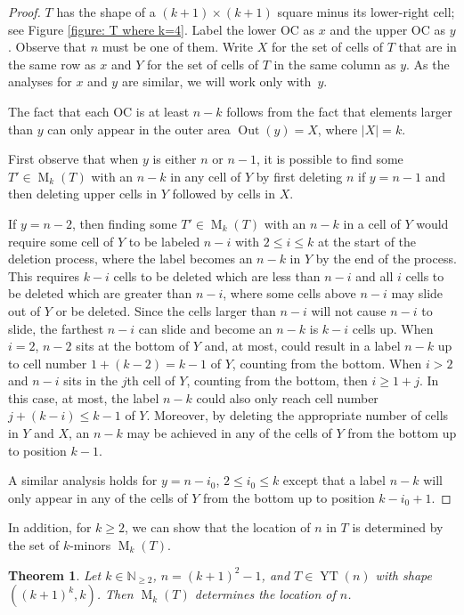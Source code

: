 \documentclass[12pt]{amsart}
\newtheorem{theorem}{Theorem}[section]
\theoremstyle{definition}
\theoremstyle{remark}
\numberwithin{equation}{section}
\numberwithin{figure}{section}
\newcommand{\YT}{\operatorname{YT}}
\newcommand{\M}{\operatorname{M}}
\newcommand{\Out}{\operatorname{Out}}
\newcommand{\N}{\mathbb{N}}
\begin{document}
\begin{proof}
    $T$ has the shape of a $(k+1) \times (k+1)$ square minus its lower-right cell; see Figure \ref{figure: T where k=4}.
    Label the lower OC as $x$ and the upper OC as $y$. Observe that $n$ must be one of them. Write $X$ for the set of cells of $T$ that are in the same row as $x$ and $Y$ for the set of cells of $T$ in the same column as $y$. As the analyses for $x$ and $y$ are similar, we will work only with~$y$.

    The fact that each OC is at least $n-k$ follows from the fact that elements larger than $y$ can only appear in the outer area $\Out(y) =X$, where $|X|=k$.

    First observe that when $y$ is either $n$ or $n-1$, it is possible to find some $T'\in\M_k(T)$ with an $n-k$ in any cell of $Y$ by first deleting $n$ if $y= n-1$ and then deleting upper cells in $Y$ followed by cells in $X$.

    If $y=n-2$, then finding some $T'\in\M_k(T)$ with an $n-k$ in a cell of $Y$ would require some cell of $Y$ to be labeled $n-i$ with $2\leq i \leq k$ at the start of the deletion process, where the label becomes an $n-k$ in $Y$ by the end of the process.
    This requires $k-i$ cells to be deleted which are less than $n-i$ and all $i$ cells to be deleted which are greater than $n-i$, where some cells above $n-i$ may slide out of $Y$ or be deleted. Since the cells larger than $n-i$ will not cause $n-i$ to slide, the farthest $n-i$ can slide and become an $n-k$ is $k-i$ cells up.
    When $i=2$, $n-2$ sits at the bottom of $Y$ and, at most, could result in a label $n-k$ up to cell number $1+(k-2)=k-1$ of $Y$, counting from the bottom. When $i>2$ and $n-i$ sits in the $j$th cell of $Y$, counting from the bottom, then $i\geq 1+j$. In this case, at most, the label $n-k$ could also only reach cell number $j + (k-i) \leq k-1$ of $Y$.
    Moreover, by deleting the appropriate number of cells in $Y$ and $X$, an $n-k$ may be achieved in any of the cells of $Y$ from the bottom up to position $k-1$.

    A similar analysis holds for $y=n-i_0$, $2\leq i_0 \leq k$ except that a label $n-k$ will only appear in any of the cells of $Y$ from the bottom up to position $k-i_0 +1$.
\end{proof}

In addition, for $k\ge 2$, we can show that the location of $n$ in $T$ is determined by the set of $k$-minors $\M_k(T)$.

\begin{theorem} \label{theorem: n position}
    Let $k\in\N_{\ge 2}$, $n = (k+1)^2 -1$, and $T\in\YT(n)$ with shape $((k+1)^k, k)$. Then $\M_k(T)$ determines the location of $n$.
\end{theorem}
\end{document}
